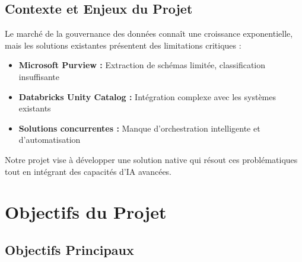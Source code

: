 \documentclass[a4paper,12pt]{article}
\begin{document}
\subsection*{Contexte et Enjeux du Projet}

Le marché de la gouvernance des données connaît une croissance exponentielle, mais les solutions existantes présentent des limitations critiques :

\begin{itemize}
    \item \textbf{Microsoft Purview :} Extraction de schémas limitée, classification insuffisante
    \item \textbf{Databricks Unity Catalog :} Intégration complexe avec les systèmes existants
    \item \textbf{Solutions concurrentes :} Manque d'orchestration intelligente et d'automatisation
\end{itemize}

Notre projet vise à développer une solution native qui résout ces problématiques tout en intégrant des capacités d'IA avancées.

\section*{Objectifs du Projet}

\subsection*{Objectifs Principaux}
\end{document}
